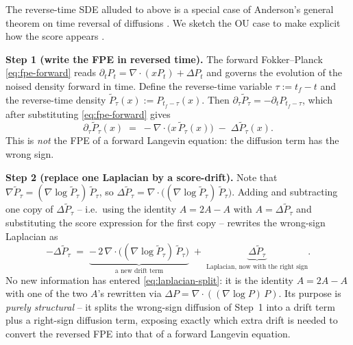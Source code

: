 \documentclass[11pt]{article}
\theoremstyle{definition}
\begin{document}
\begin{derivation}
The reverse-time SDE alluded to above is a special case of Anderson's
general theorem on time reversal of diffusions \citep{Anderson1982,
HaussmannPardoux1986}. We sketch the OU case to make explicit how the
score appears \citep{Efron2011}.

\textbf{Step 1 (write the FPE in reversed time).} The forward
Fokker--Planck \eqref{eq:fpe-forward} reads
\(\partial_t P_t = \nabla \cdot (x P_t) + \Delta P_t\) and governs
the evolution of the noised density forward in time. Define the
reverse-time variable \(\tau := t_f - t\) and the reverse-time density
\(\widetilde P_\tau(x) := P_{t_f - \tau}(x)\). Then
\(\partial_\tau \widetilde P_\tau = -\partial_t P_{t_f - \tau}\),
which after substituting \eqref{eq:fpe-forward} gives
\begin{equation}\label{eq:fpe-reversed-raw}
    \partial_\tau \widetilde P_\tau(x)
    \;=\;
    -\nabla \cdot \bigl(x\, \widetilde P_\tau(x)\bigr)
    \;-\; \Delta \widetilde P_\tau(x).
\end{equation}
This is \emph{not} the FPE of a forward Langevin equation: the
diffusion term has the wrong sign.

\textbf{Step 2 (replace one Laplacian by a score-drift).} Note that
\(\nabla \widetilde P_\tau = (\nabla \log \widetilde P_\tau)\,
\widetilde P_\tau\), so
\(\Delta \widetilde P_\tau = \nabla \cdot \bigl( (\nabla \log
\widetilde P_\tau)\, \widetilde P_\tau \bigr)\). Adding and
subtracting one copy of \(\Delta \widetilde P_\tau\) -- i.e.\ using
the identity \(A = 2 A - A\) with
\(A = \Delta \widetilde P_\tau\) and substituting the score
expression for the first copy -- rewrites the wrong-sign Laplacian as
\begin{equation}\label{eq:laplacian-split}
    -\Delta \widetilde P_\tau
    \;=\;
    \underbrace{-\, 2\, \nabla \cdot \bigl(
        (\nabla \log \widetilde P_\tau)\, \widetilde P_\tau
    \bigr)}_{\text{a new drift term}}
    \;+\;
    \underbrace{\Delta \widetilde P_\tau}_{\text{Laplacian, now with the right sign}}.
\end{equation}
No new information has entered \eqref{eq:laplacian-split}: it is the
identity \(A = 2 A - A\) with one of the two \(A\)'s rewritten via
\(\Delta P = \nabla \cdot ((\nabla \log P)\, P)\). Its purpose is
\emph{purely structural} -- it splits the wrong-sign diffusion of
Step~1 into a drift term plus a right-sign diffusion term, exposing
exactly which extra drift is needed to convert the reversed FPE into
that of a forward Langevin equation.


\end{derivation}
\end{document}
